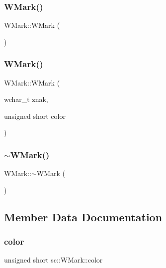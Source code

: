 \subsubsection{\texorpdfstring{WMark()}{WMark()}\hspace{0.1cm}{\footnotesize\ttfamily [1/2]}}
{\footnotesize\ttfamily W\+Mark\+::\+W\+Mark (\begin{DoxyParamCaption}{ }\end{DoxyParamCaption})}

\mbox{\label{classsc_1_1_w_mark_ac1a4b8f82dac4a4cbeca351595e3e3f8}} 
\subsubsection{\texorpdfstring{WMark()}{WMark()}\hspace{0.1cm}{\footnotesize\ttfamily [2/2]}}
{\footnotesize\ttfamily W\+Mark\+::\+W\+Mark (\begin{DoxyParamCaption}\item[{wchar\+\_\+t}]{znak,  }\item[{unsigned short}]{color }\end{DoxyParamCaption})}

\mbox{\label{classsc_1_1_w_mark_aa9b238a1e82030750453619de2da7cff}} 
\subsubsection{\texorpdfstring{$\sim$WMark()}{~WMark()}}
{\footnotesize\ttfamily W\+Mark\+::$\sim$\+W\+Mark (\begin{DoxyParamCaption}{ }\end{DoxyParamCaption})}



\subsection{Member Data Documentation}
\mbox{\label{classsc_1_1_w_mark_a0e65a03e3f7da35a2a24a83942cad9cd}} 
\subsubsection{\texorpdfstring{color}{color}}
{\footnotesize\ttfamily unsigned short sc\+::\+W\+Mark\+::color}

